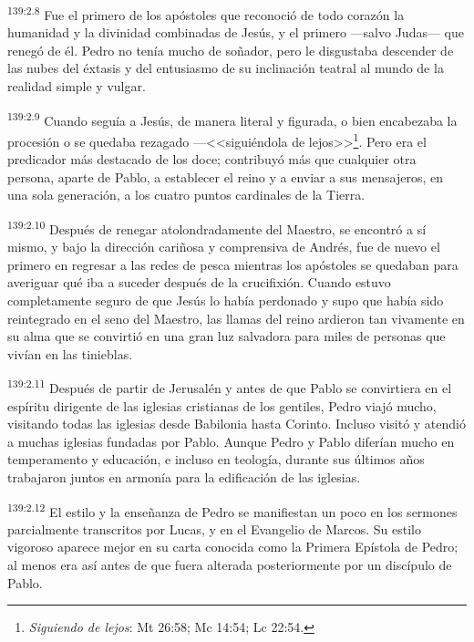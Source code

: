 \par 
\textsuperscript{139:2.8} Fue el primero de los apóstoles que reconoció de todo corazón la humanidad y la divinidad combinadas de Jesús, y el primero ---salvo Judas--- que renegó de él. Pedro no tenía mucho de soñador, pero le disgustaba descender de las nubes del éxtasis y del entusiasmo de su inclinación teatral al mundo de la realidad simple y vulgar.

\par 
\textsuperscript{139:2.9} Cuando seguía a Jesús, de manera literal y figurada, o bien encabezaba la procesión o se quedaba rezagado ---<<siguiéndola de lejos>>\footnote{\textit{Siguiendo de lejos}: Mt 26:58; Mc 14:54; Lc 22:54.}. Pero era el predicador más destacado de los doce; contribuyó más que cualquier otra persona, aparte de Pablo, a establecer el reino y a enviar a sus mensajeros, en una sola generación, a los cuatro puntos cardinales de la Tierra.

\par 
\textsuperscript{139:2.10} Después de renegar atolondradamente del Maestro, se encontró a sí mismo, y bajo la dirección cariñosa y comprensiva de Andrés, fue de nuevo el primero en regresar a las redes de pesca mientras los apóstoles se quedaban para averiguar qué iba a suceder después de la crucifixión. Cuando estuvo completamente seguro de que Jesús lo había perdonado y supo que había sido reintegrado en el seno del Maestro, las llamas del reino ardieron tan vivamente en su alma que se convirtió en una gran luz salvadora para miles de personas que vivían en las tinieblas.

\par 
\textsuperscript{139:2.11} Después de partir de Jerusalén y antes de que Pablo se convirtiera en el espíritu dirigente de las iglesias cristianas de los gentiles, Pedro viajó mucho, visitando todas las iglesias desde Babilonia hasta Corinto. Incluso visitó y atendió a muchas iglesias fundadas por Pablo. Aunque Pedro y Pablo diferían mucho en temperamento y educación, e incluso en teología, durante sus últimos años trabajaron juntos en armonía para la edificación de las iglesias.

\par 
\textsuperscript{139:2.12} El estilo y la enseñanza de Pedro se manifiestan un poco en los sermones parcialmente transcritos por Lucas, y en el Evangelio de Marcos. Su estilo vigoroso aparece mejor en su carta conocida como la Primera Epístola de Pedro; al menos era así antes de que fuera alterada posteriormente por un discípulo de Pablo.

